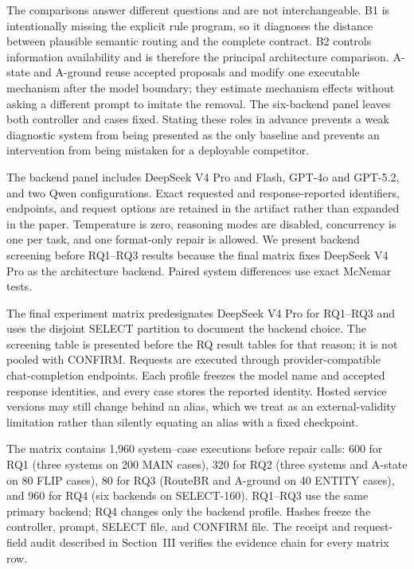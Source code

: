 \documentclass[10pt,conference,a4paper]{IEEEtran}
\newcommand{\method}{RouteBR}
\begin{document}
The comparisons answer different questions and are not interchangeable. B1 is intentionally missing the explicit rule program, so it diagnoses the distance between plausible semantic routing and the complete contract. B2 controls information availability and is therefore the principal architecture comparison. A-state and A-ground reuse accepted proposals and modify one executable mechanism after the model boundary; they estimate mechanism effects without asking a different prompt to imitate the removal. The six-backend panel leaves both controller and cases fixed. Stating these roles in advance prevents a weak diagnostic system from being presented as the only baseline and prevents an intervention from being mistaken for a deployable competitor.

The backend panel includes DeepSeek V4 Pro and Flash, GPT-4o and GPT-5.2, and two Qwen configurations. Exact requested and response-reported identifiers, endpoints, and request options are retained in the artifact rather than expanded in the paper. Temperature is zero, reasoning modes are disabled, concurrency is one per task, and one format-only repair is allowed. We present backend screening before RQ1--RQ3 results because the final matrix fixes DeepSeek V4 Pro as the architecture backend. Paired system differences use exact McNemar tests.

The final experiment matrix predesignates DeepSeek V4 Pro for RQ1--RQ3 and uses the disjoint SELECT partition to document the backend choice. The screening table is presented before the RQ result tables for that reason; it is not pooled with CONFIRM. Requests are executed through provider-compatible chat-completion endpoints. Each profile freezes the model name and accepted response identities, and every case stores the reported identity. Hosted service versions may still change behind an alias, which we treat as an external-validity limitation rather than silently equating an alias with a fixed checkpoint.

The matrix contains 1,960 system--case executions before repair calls: 600 for RQ1 (three systems on 200 MAIN cases), 320 for RQ2 (three systems and A-state on 80 FLIP cases), 80 for RQ3 (\method{} and A-ground on 40 ENTITY cases), and 960 for RQ4 (six backends on SELECT-160). RQ1--RQ3 use the same primary backend; RQ4 changes only the backend profile. Hashes freeze the controller, prompt, SELECT file, and CONFIRM file. The receipt and request-field audit described in Section~III verifies the evidence chain for every matrix row.
\end{document}
